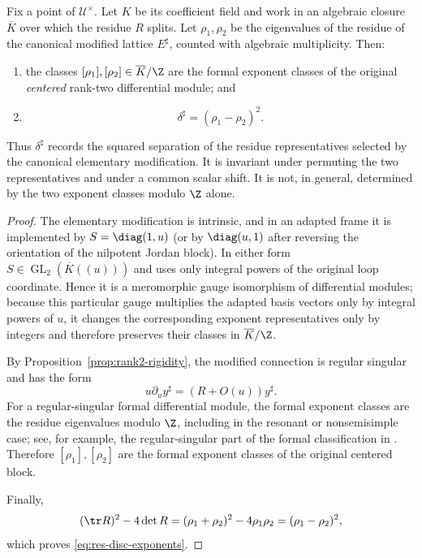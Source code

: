 \begin{proposition}
\label{prop:residue-discriminant-exponents}
%
%
%
Fix a point of $\mathcal U^\times$.  Let $K$ be its coefficient field and
work in an algebraic closure $\overline K$ over which the residue $R$ splits.
Let $\rho_1,\rho_2$ be the eigenvalues of the residue of the canonical
modified lattice $E^\sharp$, counted with algebraic multiplicity.  Then:
\begin{enumerate}[label=(\roman*)]
\item the classes $[\rho_1],[\rho_2]\in\overline K/\Z$ are the formal
  exponent classes of the original \emph{centered} rank-two differential
  module; and
\item
\begin{equation}\label{eq:res-disc-exponents}
  \delta^\sharp=(\rho_1-\rho_2)^2.
\end{equation}
\end{enumerate}
Thus $\delta^\sharp$ records the squared separation of the residue
representatives selected by the canonical elementary modification.  It is
invariant under permuting the two representatives and under a common scalar
shift.  It is not, in general, determined by the two exponent classes modulo
$\Z$ alone.
\end{proposition}

\begin{proof}
The elementary modification is intrinsic, and in an adapted frame it is
implemented by $S=\diag(1,u)$ (or by $\diag(u,1)$ after reversing the
orientation of the nilpotent Jordan block).  In either form
$S\in\operatorname{GL}_2(\overline K((u)))$ and uses only integral powers of
the original loop coordinate.  Hence it is a meromorphic gauge isomorphism
of differential modules; because this particular gauge multiplies the
adapted basis vectors only by integral powers of $u$, it changes the
corresponding exponent representatives only by integers and therefore
preserves their classes in $\overline K/\Z$.

By Proposition~\ref{prop:rank2-rigidity}, the modified connection is regular
singular and has the form
\[
  u\partial_u y^\sharp=(R+O(u))y^\sharp.
\]
For a regular-singular formal differential module, the formal exponent
classes are the residue eigenvalues modulo $\Z$, including in the resonant
or nonsemisimple case; see, for example, the regular-singular part of the
formal classification in \cite[Chapter~3]{PutSinger}.  Therefore
$[\rho_1],[\rho_2]$ are the formal exponent classes of the original centered
block.

Finally,
\[
 (\tr R)^2-4\det R
 = (\rho_1+\rho_2)^2-4\rho_1\rho_2
 = (\rho_1-\rho_2)^2,
\]
which proves \eqref{eq:res-disc-exponents}.
%
\end{proof}

